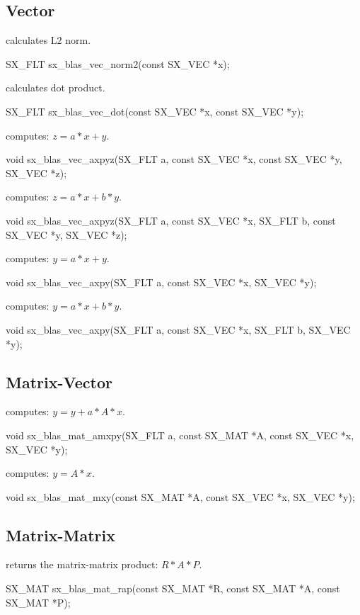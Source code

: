 \subsection{Vector}
 calculates L2 norm.
\begin{evb}
SX_FLT sx_blas_vec_norm2(const SX_VEC *x);
\end{evb}

 calculates dot product.
\begin{evb}
SX_FLT sx_blas_vec_dot(const SX_VEC *x, const SX_VEC *y);
\end{evb}

 computes: $z = a * x + y$.
\begin{evb}
void sx_blas_vec_axpyz(SX_FLT a, const SX_VEC *x, const SX_VEC *y, SX_VEC *z);
\end{evb}

 computes: $z = a * x + b * y$.
\begin{evb}
void sx_blas_vec_axpyz(SX_FLT a, const SX_VEC *x, SX_FLT b, const SX_VEC *y, SX_VEC *z);
\end{evb}

 computes: $y = a * x + y$.
\begin{evb}
void sx_blas_vec_axpy(SX_FLT a, const SX_VEC *x, SX_VEC *y);
\end{evb}

 computes: $y = a * x + b * y$.
\begin{evb}
void sx_blas_vec_axpy(SX_FLT a, const SX_VEC *x, SX_FLT b, SX_VEC *y);
\end{evb}

\subsection{Matrix-Vector}
 computes: $ y = y + a * A * x $.
\begin{evb}
void sx_blas_mat_amxpy(SX_FLT a, const SX_MAT *A, const SX_VEC *x, SX_VEC *y);
\end{evb}

 computes: $y = A * x $.
\begin{evb}
void sx_blas_mat_mxy(const SX_MAT *A, const SX_VEC *x, SX_VEC *y);
\end{evb}

\subsection{Matrix-Matrix}
 returns the matrix-matrix product: $ R * A * P$.
\begin{evb}
SX_MAT sx_blas_mat_rap(const SX_MAT *R, const SX_MAT *A, const SX_MAT *P);
\end{evb}
